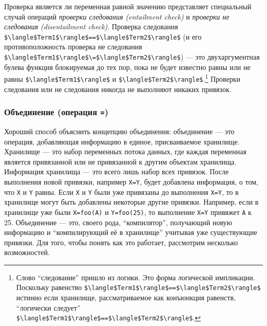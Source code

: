 Проверка является ли переменная равной значению представляет специальный случай операций \emph{проверки следования (entailment check)} и \emph{проверки не следования (disentailment check)}. Проверка следования \lstinline!$\langle$Term1$\rangle$==$\langle$Term2$\rangle$! (и его противоположность проверка не следования \lstinline!$\langle$Term1$\rangle$\=$\langle$Term2$\rangle$!) --- это двухаргументная булева функция блокируемая до тех пор, пока не будет известно равны или не равны \lstinline!$\langle$Term1$\rangle$! и \lstinline!$\langle$Term2$\rangle$!.\footnote{Слово ``следование'' пришло из логики. Это форма логической импликации. Поскольку равенство \lstinline!$\langle$Term1$\rangle$==$\langle$Term2$\rangle$! истинно если хранилище, рассматриваемое как конъюнкция равенств, ``логически следует'' \lstinline!$\langle$Term1$\rangle$==$\langle$Term2$\rangle$!.} Проверки следования или не следования никогда не выполняют никаких привязок.


\subsubsection{Объединение (операция \lstinline!=!)}

Хороший способ объяснить концепцию объединения: объединение --- это операция, добавляющая информацию в единое, присваиваемое хранилище. Хранилище --- это набор переменных потока данных, где каждая переменная является привязанной или не привязанной к другим объектам хранилища. Информация хранилища --- это всего лишь набор всех привязок. После выполнения новой привязки, например \lstinline!X=Y!, будет добавлена информация, о том, что \lstinline!X! и \lstinline!Y! равны. Если \lstinline!X! и \lstinline!Y! были уже привязаны до выполнения \lstinline!X=Y!, то в хранилище могут быть добавлены некоторые другие привязки. Например, если в хранилище уже были \lstinline!X=foo(A)! и \lstinline!Y=foo(25)!, то выполнение \lstinline!X=Y! привяжет \lstinline!A! к 25. Объединение --- это, своего рода, ``компилятор'', получающий новую информацию и ``компилирующий её в хранилище'' учитывая уже существующие привязки. Для того, чтобы понять как это работает, рассмотрим несколько возможностей.


